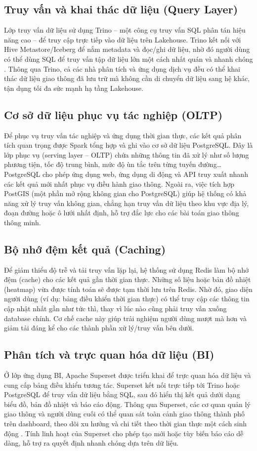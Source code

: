 \subsection{Truy vấn và khai thác dữ liệu (Query Layer)}
Lớp truy vấn dữ liệu sử dụng Trino – một công cụ truy vấn SQL phân tán hiệu năng cao – để truy cập trực tiếp vào dữ liệu trên Lakehouse. Trino kết nối với Hive Metastore/Iceberg để nắm metadata và đọc/ghi dữ liệu, nhờ đó người dùng có thể dùng SQL để truy vấn tập dữ liệu lớn một cách nhất quán và
nhanh chóng . Thông qua Trino, cả các nhà phân tích và ứng dụng dịch vụ đều có thể khai thác dữ liệu giao thông đã lưu trữ mà không cần di chuyển dữ liệu sang hệ khác, tận dụng tối đa sức mạnh hạ tầng Lakehouse.
\subsection{Cơ sở dữ liệu phục vụ tác nghiệp (OLTP)}
Để phục vụ truy vấn tác nghiệp và ứng dụng thời gian thực, các kết quả phân tích quan trọng được Spark tổng hợp và ghi vào cơ sở dữ liệu PostgreSQL. Đây là lớp phục vụ (serving layer – OLTP) chứa những thông tin đã xử lý như số lượng phương tiện, tốc độ trung bình, mức độ ùn tắc trên từng tuyến đường… PostgreSQL cho phép ứng dụng web, ứng dụng di động và API truy xuất nhanh các kết quả mới nhất phục vụ điều hành giao thông. Ngoài ra, việc tích hợp PostGIS (một phần mở rộng không gian cho PostgreSQL) giúp hệ thống có khả năng xử lý truy vấn không gian, chẳng hạn truy vấn dữ liệu theo khu vực địa lý, đoạn đường hoặc ô lưới nhất định, hỗ trợ đắc lực cho các bài toán giao thông thông minh.
\subsection{Bộ nhớ đệm kết quả (Caching)}
Để giảm thiểu độ trễ và tải truy vấn lặp lại, hệ thống sử dụng Redis làm bộ nhớ đệm (cache) cho các kết quả gần thời gian thực. Những số liệu hoặc bản đồ nhiệt (heatmap) vừa được tính toán sẽ được tạm thời lưu trên Redis. Nhờ đó, giao diện người dùng (ví dụ: bảng điều khiển thời gian thực) có thể truy cập
các thông tin cập nhật nhất gần như tức thì, thay vì lúc nào cũng phải truy vấn xuống database chính. Cơ chế cache này giúp trải nghiệm người dùng mượt mà hơn và giảm tải đáng kể cho các thành phần
xử lý/truy vấn bên dưới.
\subsection{Phân tích và trực quan hóa dữ liệu (BI)}
Ở lớp ứng dụng BI, Apache Superset được triển khai để trực quan hóa dữ liệu và cung cấp bảng điều khiển tương tác. Superset kết nối trực tiếp tới Trino hoặc PostgreSQL để truy vấn dữ liệu bằng SQL, sau đó hiển thị kết quả dưới dạng biểu đồ, bản đồ nhiệt và báo cáo động. Thông qua Superset, các cơ quan
quản lý giao thông và người dùng cuối có thể quan sát toàn cảnh giao thông thành phố trên dashboard, theo dõi xu hướng và chi tiết theo thời gian thực một cách sinh động . Tính linh hoạt của Superset cho phép tạo mới hoặc tùy biến báo cáo dễ dàng, hỗ trợ ra quyết định nhanh chóng dựa trên dữ liệu.

